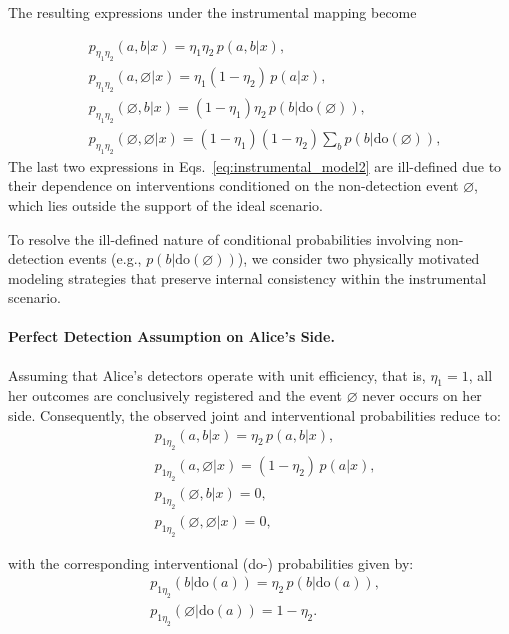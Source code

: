 \documentclass[aps,pra,reprint, superscriptaddress,showkeys]{revtex4-2}
\theoremstyle{plain}
\begin{document}
The resulting expressions under the instrumental mapping become

\begin{align}
&p_{\eta_1 \eta_2}(a, b | x) = \eta_1 \eta_2\, p(a, b | x), \nonumber \\
&p_{\eta_1 \eta_2}(a, \varnothing | x) = \eta_1(1 - \eta_2)\, p(a | x), \nonumber \\
&p_{\eta_1 \eta_2}(\varnothing, b | x) = (1 - \eta_1)\eta_2\, p(b | \text{do}(\varnothing)), \nonumber \\
&p_{\eta_1 \eta_2}(\varnothing, \varnothing | x) = (1 - \eta_1)(1 - \eta_2) \sum_b p(b | \text{do}(\varnothing)), \label{eq:instrumental_model2}
\end{align}
The last two expressions in Eqs.~\eqref{eq:instrumental_model2} are ill-defined due to their dependence on interventions conditioned on the non-detection event $\varnothing$, which lies outside the support of the ideal scenario.

To resolve the ill-defined nature of conditional probabilities involving non-detection events (e.g., $p(b | \text{do}(\varnothing))$), we consider two physically motivated modeling strategies that preserve internal consistency within the instrumental scenario.

\paragraph{Perfect Detection Assumption on Alice's Side.}
Assuming that Alice's detectors operate with unit efficiency, that is, $\eta_1 = 1$, all her outcomes are conclusively registered and the event $\varnothing$ never occurs on her side. Consequently, the observed joint and interventional probabilities reduce to:
\begin{align}
&p_{1 \eta_2}(a, b | x) = \eta_2\, p(a, b | x), \nonumber \\
&p_{1 \eta_2}(a, \varnothing | x) = (1 - \eta_2)\, p(a | x), \nonumber \\
&p_{1 \eta_2}(\varnothing, b | x) = 0, \nonumber \\
&p_{1 \eta_2}(\varnothing, \varnothing | x) = 0,
\end{align}

with the corresponding interventional (do-) probabilities given by:
\begin{align}
&p_{1 \eta_2}(b | \text{do}(a)) = \eta_2\, p(b | \text{do}(a)), \nonumber \\
&p_{1 \eta_2}(\varnothing | \text{do}(a)) = 1 - \eta_2.
\end{align}
\end{document}
